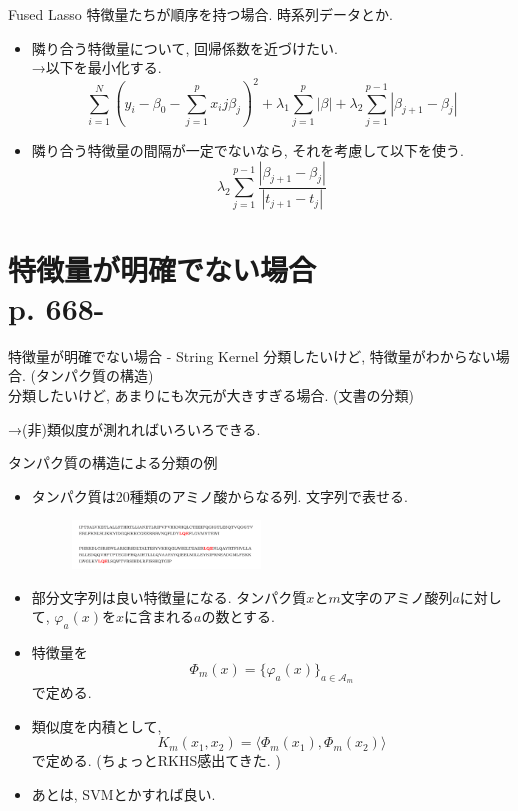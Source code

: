 \documentclass[dvipdfmx,8pt]{beamer}
\begin{document}
  \begin{frame}{Fused Lasso}
    特徴量たちが順序を持つ場合. 時系列データとか.
    \begin{itemize}
      \item 隣り合う特徴量について, 回帰係数を近づけたい. \\
        →以下を最小化する.
        \[
          \sum_{i=1}^N(y_i-\beta_0-\sum_{j=1}^px_ij\beta_j)^2+\lambda_1\sum_{j=1}^p|\beta|+\lambda_2\sum_{j=1}^{p-1}|\beta_{j+1}-\beta_j|
        \]
      \item 隣り合う特徴量の間隔が一定でないなら, それを考慮して以下を使う.
        \[
          \lambda_2\sum_{j=1}^{p-1}\frac{|\beta_{j+1}-\beta_j|}{|t_{j+1}-t_j|}
        \]
    \end{itemize}
  \end{frame}
  \section{特徴量が明確でない場合\\p. 668-}
  \begin{frame}{特徴量が明確でない場合 - String Kernel}
    分類したいけど, 特徴量がわからない場合. (タンパク質の構造)\\
    分類したいけど, あまりにも次元が大きすぎる場合. (文書の分類)

    →(非)類似度が測れればいろいろできる.

    \vspace{\baselineskip}

    タンパク質の構造による分類の例
    \begin{itemize}
      \item タンパク質は20種類のアミノ酸からなる列. 文字列で表せる.
        \begin{figure}
          \centering
          \includegraphics[width=5cm]{./images/protains.png}
        \end{figure}
      \item 部分文字列は良い特徴量になる. タンパク質$x$と$m$文字のアミノ酸列$a$に対して,
        $\varphi_a(x)$を$x$に含まれる$a$の数とする.
      \item 特徴量を
        \[
          \Phi_m(x)=\{\varphi_a(x)\}_{a\in\mathcal{A}_m}
        \]
        で定める.
      \item 類似度を内積として,
        \[
          K_m(x_1,x_2)=\langle\Phi_m(x_1),\Phi_m(x_2)\rangle
        \]
        で定める. (ちょっとRKHS感出てきた. )
      \item あとは, SVMとかすれば良い.
    \end{itemize}
  \end{frame}
\end{document}
